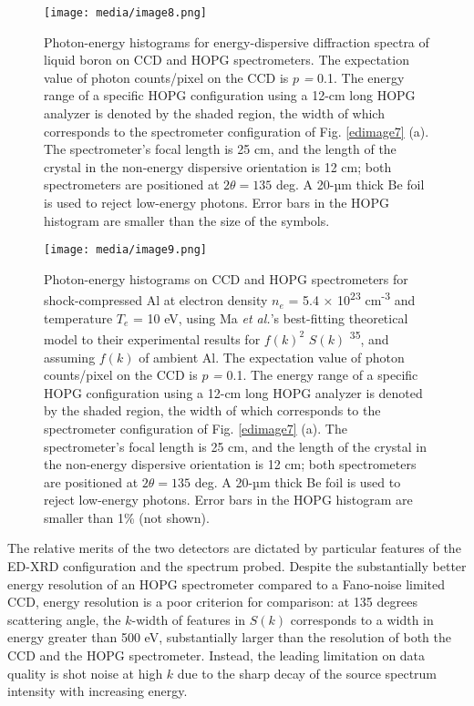 \begin{figure}[h] 
\caption{ Photon-energy histograms for energy-dispersive diffraction
spectra of liquid boron on CCD and HOPG spectrometers. The expectation
value of photon counts/pixel on the CCD is \(p\) \emph{=} 0.1. The
energy range of a specific HOPG configuration using a 12-cm long HOPG
analyzer is denoted by the shaded region, the width of which corresponds
to the spectrometer configuration of Fig. \ref{edimage7} (a). The spectrometer's
focal length is 25 cm, and the length of the crystal in the non-energy
dispersive orientation is 12 cm; both spectrometers are positioned at
\(2\theta = 135\) deg. A 20-µm thick Be foil is used to reject
low-energy photons. Error bars in the HOPG histogram are smaller than
the size of the symbols.}
\label{edimage8}
\centering
\texttt{[image: media/image8.png]}
\end{figure}

\begin{figure}[h] 
\caption{ Photon-energy histograms on
CCD and HOPG spectrometers for shock-compressed Al at electron density
\(n_{e}\) = 5.4 × 10\textsuperscript{23} cm\textsuperscript{-3} and
temperature \(T_{e}\) = 10 eV, using Ma \emph{et al.}'s best-fitting
theoretical model to their experimental results for \({f(k)}^{2}\)
\(S(k)\)
{\textsuperscript{35}},
and assuming \(f(k)\) of ambient Al. The expectation value of photon
counts/pixel on the CCD is \(p\) \emph{=} 0.1. The energy range of a
specific HOPG configuration using a 12-cm long HOPG analyzer is denoted
by the shaded region, the width of which corresponds to the spectrometer
configuration of Fig. \ref{edimage7} (a). The spectrometer's focal length is 25 cm,
and the length of the crystal in the non-energy dispersive orientation
is 12 cm; both spectrometers are positioned at \(2\theta = 135\) deg. A
20-µm thick Be foil is used to reject low-energy photons. Error bars in
the HOPG histogram are smaller than 1\% (not shown).}
\label{edimage9}
\centering
\texttt{[image: media/image9.png]}
\end{figure}


The relative merits of the two detectors are dictated by particular
features of the ED-XRD configuration and the spectrum probed. Despite
the substantially better energy resolution of an HOPG spectrometer
compared to a Fano-noise limited CCD, energy resolution is a poor
criterion for comparison: at 135 degrees scattering angle, the
\(k\)-width of features in \(S(k)\) corresponds to a width in energy
greater than 500 eV, substantially larger than the resolution of both
the CCD and the HOPG spectrometer. Instead, the leading limitation on
data quality is shot noise at high \(k\) due to the sharp decay of the
source spectrum intensity with increasing energy.


